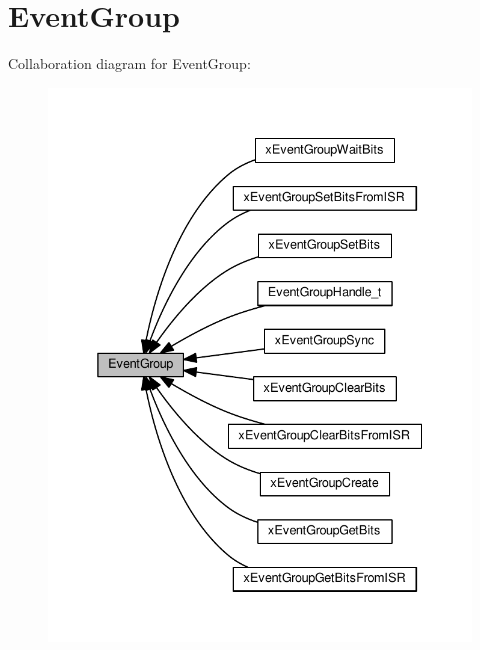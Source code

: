 \hypertarget{group__EventGroup}{}\section{Event\+Group}
\label{group__EventGroup}
Collaboration diagram for Event\+Group\+:\nopagebreak
\begin{figure}[H]
\begin{center}
\leavevmode
\includegraphics[width=338pt]{dc/d84/group__EventGroup}
\end{center}
\end{figure}
